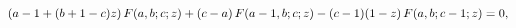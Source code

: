 \[\left(a-1+(b+1-c)z\right)\mathop{F\/}\nolimits\!\left(a,b;c;z\right)+(c-a)%
\mathop{F\/}\nolimits\!\left(a-1,b;c;z\right)-(c-1)(1-z)\mathop{F\/}\nolimits%
\!\left(a,b;c-1;z\right)=0,\]